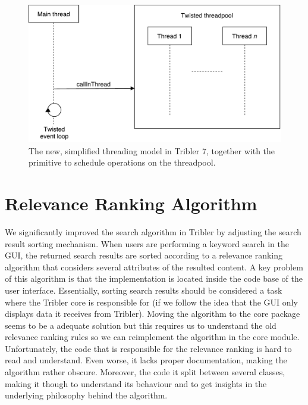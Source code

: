 \begin{figure}[h!]
	\centering
	\includegraphics[width=0.7\columnwidth]{images/improving_qa/new_threading_model_tribler}
	\caption{The new, simplified threading model in Tribler 7, together with the primitive to schedule operations on the threadpool.}
	\label{fig:new-threading-model}
\end{figure}

\section{Relevance Ranking Algorithm}
\label{sec:relevance-ranking-algorithm}
We significantly improved the search algorithm in Tribler by adjusting the search result sorting mechanism. When users are performing a keyword search in the GUI, the returned search results are sorted according to a relevance ranking algorithm that considers several attributes of the resulted content. A key problem of this algorithm is that the implementation is located inside the code base of the user interface. Essentially, sorting search results should be considered a task where the Tribler core is responsible for (if we follow the idea that the GUI only displays data it receives from Tribler). Moving the algorithm to the core package seems to be a adequate solution but this requires us to understand the old relevance ranking rules so we can reimplement the algorithm in the core module. Unfortunately, the code that is responsible for the relevance ranking is hard to read and understand. Even worse, it lacks proper documentation, making the algorithm rather obscure. Moreover, the code it split between several classes, making it though to understand its behaviour and to get insights in the underlying philosophy behind the algorithm.

